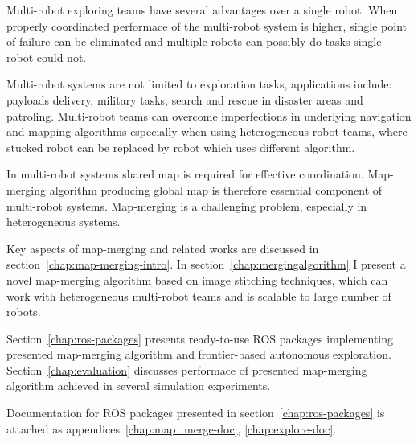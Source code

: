 
Multi-robot exploring teams have several advantages over a single robot. When properly coordinated performace of the multi-robot system is higher, single point of failure can be eliminated and multiple robots can possibly do tasks single robot could not.

Multi-robot systems are not limited to exploration tasks, applications include: payloads delivery, military tasks, search and rescue in disaster areas and patroling. Multi-robot teams can overcome imperfections in underlying navigation and mapping algorithms especially when using heterogeneous robot teams, where stucked robot can be replaced by robot which uses different algorithm.

In multi-robot systems shared map is required for effective coordination. Map-merging algorithm producing global map is therefore essential component of multi-robot systems. Map-merging is a challenging problem, especially in heterogeneous systems.

Key aspects of map-merging and related works are discussed in section~\ref{chap:map-merging-intro}. In section~\ref{chap:mergingalgorithm} I present a novel map-merging algorithm based on image stitching techniques, which can work with heterogeneous multi-robot teams and is scalable to large number of robots.

Section~\ref{chap:ros-packages} presents ready-to-use \gls{ROS} packages implementing presented map-merging algorithm and frontier-based autonomous exploration. Section~\ref{chap:evaluation} discusses performace of presented map-merging algorithm achieved in several simulation experiments.

Documentation for \gls{ROS} packages presented in section~\ref{chap:ros-packages} is attached as appendices~\ref{chap:map_merge-doc}, \ref{chap:explore-doc}.
